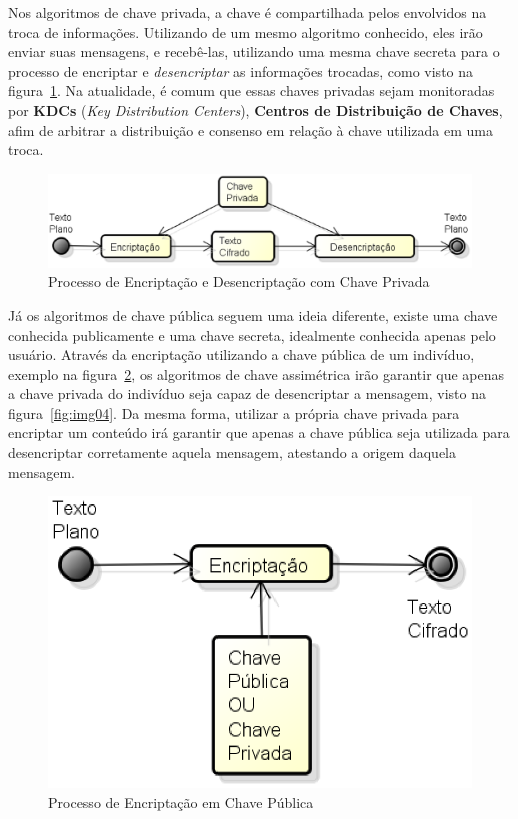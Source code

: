 	Nos algoritmos de chave privada, a chave é compartilhada pelos envolvidos na troca de informações. Utilizando de um mesmo algoritmo conhecido, eles irão enviar suas mensagens, e recebê-las, utilizando uma mesma chave secreta para o processo de encriptar e \textit{desencriptar} as informações trocadas, como visto na figura~\ref{fig:img02}. Na atualidade, é comum que essas chaves privadas sejam monitoradas por \textbf{KDCs} (\textit{Key Distribution Centers}), \textbf{Centros de Distribuição de Chaves}, afim de arbitrar a distribuição e consenso em relação à chave utilizada em uma troca.

	\begin{figure}[h]
		\centering
		\includegraphics[keepaspectratio=true,scale=0.5]{figuras/img01.eps}
		\caption{Processo de Encriptação e Desencriptação com Chave Privada}
		\label{fig:img02}
	\end{figure}

	Já os algoritmos de chave pública seguem uma ideia diferente, existe uma chave conhecida publicamente e uma chave secreta, idealmente conhecida apenas pelo usuário. Através da encriptação utilizando a chave pública de um indivíduo, exemplo na figura~\ref{fig:img03}, os algoritmos de chave assimétrica irão garantir que apenas a chave privada do indivíduo seja capaz de desencriptar a mensagem, visto na figura~\ref{fig:img04}. Da mesma forma, utilizar a própria chave privada para encriptar um conteúdo irá garantir que apenas a chave pública seja utilizada para desencriptar corretamente aquela mensagem, atestando a origem daquela mensagem.

	\begin{figure}[!ht]
		\centering
		\includegraphics[keepaspectratio=true,scale=0.5]{figuras/encript.eps}
		\caption{Processo de Encriptação em Chave Pública}
		\label{fig:img03}
	\end{figure}
	
